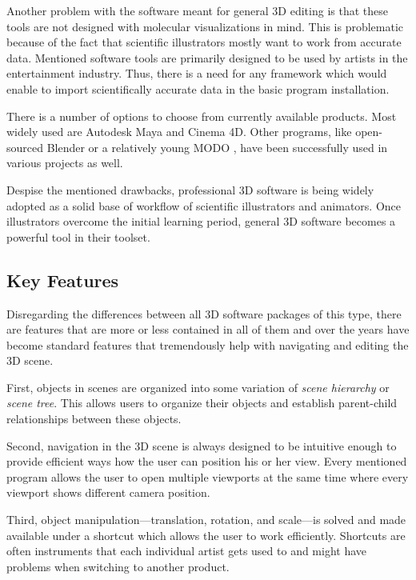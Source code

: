 \documentclass[
  digital, %
  table,   %
  nolof,     %
  nolot,     %
  oneside,
]{fithesis3}
\begin{document}
Another problem with the software meant for general 3D editing is that these tools are not designed with molecular visualizations in mind. This is problematic because of the fact that scientific illustrators mostly want to work from accurate data. Mentioned software tools are primarily designed to be used by artists in the entertainment industry. Thus, there is a need for any framework which would enable to import scientifically accurate data in the basic program installation.

There is a number of options to choose from currently available products. Most widely used are Autodesk Maya and Cinema 4D. Other programs, like open-sourced Blender or a relatively young MODO \cite{MODOscientificIll}, have been successfully used in various projects as well.

Despise the mentioned drawbacks, professional 3D software is being widely adopted as a solid base of workflow of scientific illustrators and animators. Once illustrators overcome the initial learning period, general 3D software becomes a powerful tool in their toolset. 


\subsection{Key Features}
Disregarding the differences between all 3D software packages of this type, there are features that are more or less contained in all of them and over the years have become standard features that tremendously help with navigating and editing the 3D scene.

First, objects in scenes are organized into some variation of \textit{scene hierarchy} or \textit{scene tree}. This allows users to organize their objects and establish parent-child relationships between these objects.

Second, navigation in the 3D scene is always designed to be intuitive enough to provide efficient ways how the user can position his or her view. Every mentioned program allows the user to open multiple viewports at the same time where every viewport shows different camera position.

Third, object manipulation—translation, rotation, and scale—is solved and made available under a shortcut which allows the user to work efficiently. Shortcuts are often instruments that each individual artist gets used to and might have problems when switching to another product.
\end{document}
